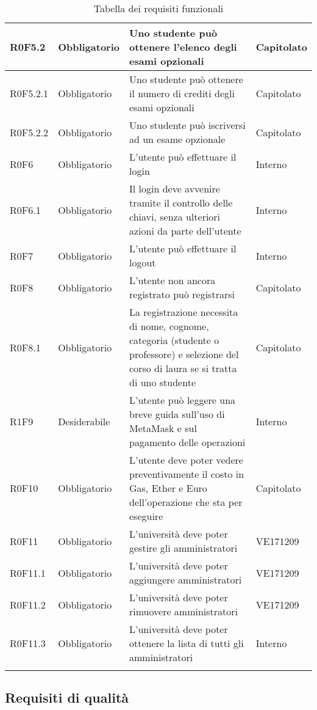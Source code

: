\documentclass[AnalisiDeiRequisiti.tex]{subfiles}
\begin{document}
\begin{longtable}[H]{|p{2.5cm}|p{2.5cm}|p{5cm}|p{2cm}|}
	R0F5.2 & Obbligatorio & Uno studente può ottenere l'elenco degli esami opzionali & Capitolato \\ \hline
	R0F5.2.1 & Obbligatorio & Uno studente può ottenere il numero di crediti degli esami opzionali & Capitolato \\ \hline
	R0F5.2.2 & Obbligatorio & Uno studente può iscriversi ad un esame opzionale & Capitolato \\ \hline
	R0F6 & Obbligatorio & L'utente può effettuare il login & Interno \\ \hline
	R0F6.1 & Obbligatorio & Il login deve avvenire tramite il controllo delle chiavi, senza ulteriori azioni da parte dell'utente & Interno \\ \hline
	R0F7 & Obbligatorio & L'utente può effettuare il logout & Interno \\ \hline	R0F8 & Obbligatorio & L'utente non ancora registrato può registrarsi & Capitolato \\ \hline
	R0F8.1 & Obbligatorio & La registrazione necessita di nome, cognome, categoria (studente o professore) e selezione del corso di laura se si tratta di uno studente & Capitolato \\ \hline
	R1F9 & Desiderabile & L'utente può leggere una breve guida sull'uso di MetaMask e sul pagamento delle operazioni & Interno \\ \hline	
	R0F10 & Obbligatorio & L'utente deve poter vedere preventivamente il costo in Gas, Ether e Euro dell'operazione che sta per eseguire & Capitolato \\ \hline	
	R0F11 & Obbligatorio & L'università deve poter gestire gli amministratori & VE171209 \\ \hline %
	R0F11.1 & Obbligatorio & L'università deve poter aggiungere amministratori & VE171209 \\ \hline %
	R0F11.2 & Obbligatorio & L'università deve poter rimuovere amministratori & VE171209 \\ \hline %
	R0F11.3 & Obbligatorio & L'università deve poter ottenere la lista di tutti gli amministratori & Interno \\ \hline 
	\caption{Tabella dei requisiti funzionali}
\end{longtable}

\subsection{Requisiti di qualità}
\end{document}
